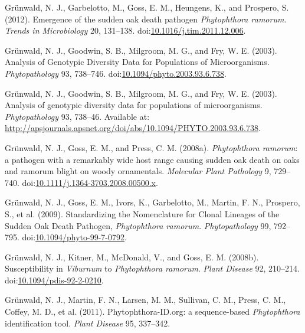 \documentclass[double,12pt]{beavtex}
\begin{document}
  \hypertarget{ref-grunwald2012emergence}{}
  Grünwald, N. J., Garbelotto, M., Goss, E. M., Heungens, K., and
  Prospero, S. (2012). Emergence of the sudden oak death pathogen
  \emph{Phytophthora ramorum}. \emph{Trends in Microbiology} 20, 131--138.
  doi:\href{https://doi.org/10.1016/j.tim.2011.12.006}{10.1016/j.tim.2011.12.006}.
  
  \hypertarget{ref-grunwald2003analysis}{}
  Grünwald, N. J., Goodwin, S. B., Milgroom, M. G., and Fry, W. E. (2003).
  Analysis of Genotypic Diversity Data for Populations of Microorganisms.
  \emph{Phytopathology} 93, 738--746.
  doi:\href{https://doi.org/10.1094/phyto.2003.93.6.738}{10.1094/phyto.2003.93.6.738}.
  
  \hypertarget{ref-Grunwald:2003}{}
  Grünwald, N. J., Goodwin, S. B., Milgroom, M. G., and Fry, W. E. (2003).
  Analysis of genotypic diversity data for populations of microorganisms.
  \emph{Phytopathology} 93, 738--46. Available at:
  \url{http://apsjournals.apsnet.org/doi/abs/10.1094/PHYTO.2003.93.6.738}.
  
  \hypertarget{ref-grunwald2008phytophthora}{}
  Grünwald, N. J., Goss, E. M., and Press, C. M. (2008a).
  \emph{Phytophthora ramorum}: a pathogen with a remarkably wide host
  range causing sudden oak death on oaks and ramorum blight on woody
  ornamentals. \emph{Molecular Plant Pathology} 9, 729--740.
  doi:\href{https://doi.org/10.1111/j.1364-3703.2008.00500.x}{10.1111/j.1364-3703.2008.00500.x}.
  
  \hypertarget{ref-grunwald2009standardizing}{}
  Grünwald, N. J., Goss, E. M., Ivors, K., Garbelotto, M., Martin, F. N.,
  Prospero, S., et al. (2009). Standardizing the Nomenclature for Clonal
  Lineages of the Sudden Oak Death Pathogen, \emph{Phytophthora ramorum}.
  \emph{Phytopathology} 99, 792--795.
  doi:\href{https://doi.org/10.1094/phyto-99-7-0792}{10.1094/phyto-99-7-0792}.
  
  \hypertarget{ref-grunwald2008susceptibility}{}
  Grünwald, N. J., Kitner, M., McDonald, V., and Goss, E. M. (2008b).
  Susceptibility in \emph{Viburnum} to \emph{Phytophthora ramorum}.
  \emph{Plant Disease} 92, 210--214.
  doi:\href{https://doi.org/10.1094/pdis-92-2-0210}{10.1094/pdis-92-2-0210}.
  
  \hypertarget{ref-grunwald2011phytophthora}{}
  Grünwald, N. J., Martin, F. N., Larsen, M. M., Sullivan, C. M., Press,
  C. M., Coffey, M. D., et al. (2011). Phytophthora-ID.org: a
  sequence-based \emph{Phytophthora} identification tool. \emph{Plant
  Disease} 95, 337--342.
  
\end{document}
